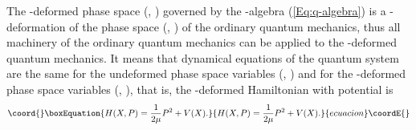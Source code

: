 \documentclass[a4paper,12pt]{article}
\begin{document}
The \coordHE{}-deformed phase space (\coordHE{}, \coordHE{}) governed by the \coordHE{}-algebra 
(\ref{Eq:q-algebra}) is a \coordHE{}-deformation of the phase space 
(\coordHE{}, \coordHE{}) of the ordinary quantum mechanics,
 thus all machinery of  the ordinary quantum mechanics can be applied to
 the \coordHE{}-deformed quantum mechanics. 
It means that dynamical equations of the quantum system are the same 
for the undeformed phase space variables (\coordHE{}, \coordHE{}) and 
for the \coordHE{}-deformed  phase space variables (\coordHE{}, \coordHE{}),
that is,  the \coordHE{}-deformed Hamiltonian with potential \coordHE{} is
\begin{equation}\coord{}\boxEquation{
\label{Eq:q-hamiltonian}
H(X,P)=\frac{1}{2\mu}P^{2}+V(X).
}{
H(X,P)=\frac{1}{2\mu}P^{2}+V(X).
}{ecuacion}\coordE{}\end{equation}
\end{document}
